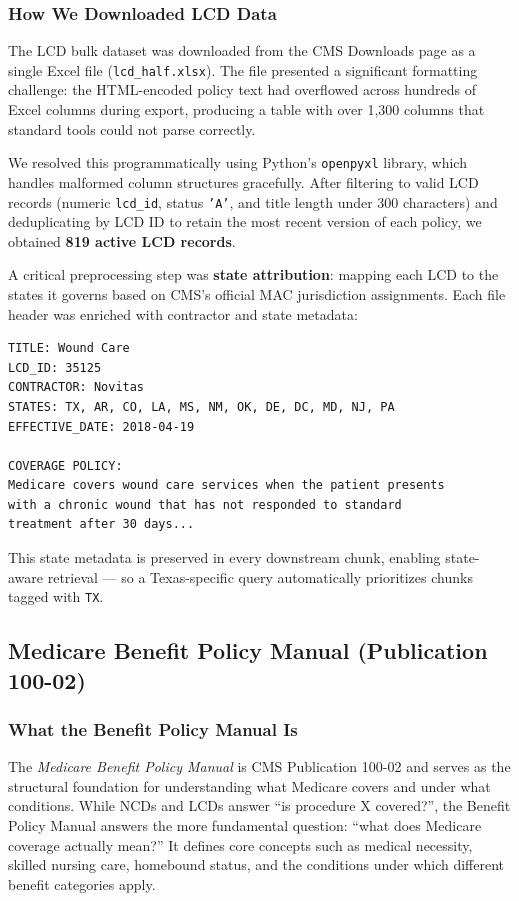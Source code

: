 \documentclass[12pt, letterpaper]{article}
\begin{document}
\subsubsection{How We Downloaded LCD Data}

The LCD bulk dataset was downloaded from the CMS Downloads page as a single Excel file
(\texttt{lcd\_half.xlsx}). The file presented a significant formatting challenge: the
HTML-encoded policy text had overflowed across hundreds of Excel columns during export,
producing a table with over 1,300 columns that standard tools could not parse correctly.

We resolved this programmatically using Python's \texttt{openpyxl} library, which
handles malformed column structures gracefully. After filtering to valid LCD records
(numeric \texttt{lcd\_id}, status \texttt{'A'}, and title length under 300 characters)
and deduplicating by LCD ID to retain the most recent version of each policy, we
obtained \textbf{819 active LCD records}.

A critical preprocessing step was \textbf{state attribution}: mapping each LCD to the
states it governs based on CMS's official MAC jurisdiction assignments. Each file header
was enriched with contractor and state metadata:

\begin{verbatim}
TITLE: Wound Care
LCD_ID: 35125
CONTRACTOR: Novitas
STATES: TX, AR, CO, LA, MS, NM, OK, DE, DC, MD, NJ, PA
EFFECTIVE_DATE: 2018-04-19

COVERAGE POLICY:
Medicare covers wound care services when the patient presents
with a chronic wound that has not responded to standard
treatment after 30 days...
\end{verbatim}

This state metadata is preserved in every downstream chunk, enabling state-aware
retrieval --- so a Texas-specific query automatically prioritizes chunks tagged
with \texttt{TX}.

\subsection{Medicare Benefit Policy Manual (Publication 100-02)}

\subsubsection{What the Benefit Policy Manual Is}

The \textit{Medicare Benefit Policy Manual} is CMS Publication 100-02 and serves as
the structural foundation for understanding what Medicare covers and under what
conditions. While NCDs and LCDs answer ``is procedure X covered?'', the Benefit Policy
Manual answers the more fundamental question: ``what does Medicare coverage actually
mean?'' It defines core concepts such as medical necessity, skilled nursing care,
homebound status, and the conditions under which different benefit categories apply.
\end{document}
